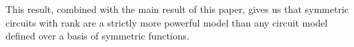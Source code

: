 \documentclass[../paper.tex]{subfiles}
\begin{document}
This result, combined with the main result of this paper, gives us that
symmetric circuits with rank are a strictly more powerful model than any circuit
model defined over a basis of symmetric functions.


\end{document}
